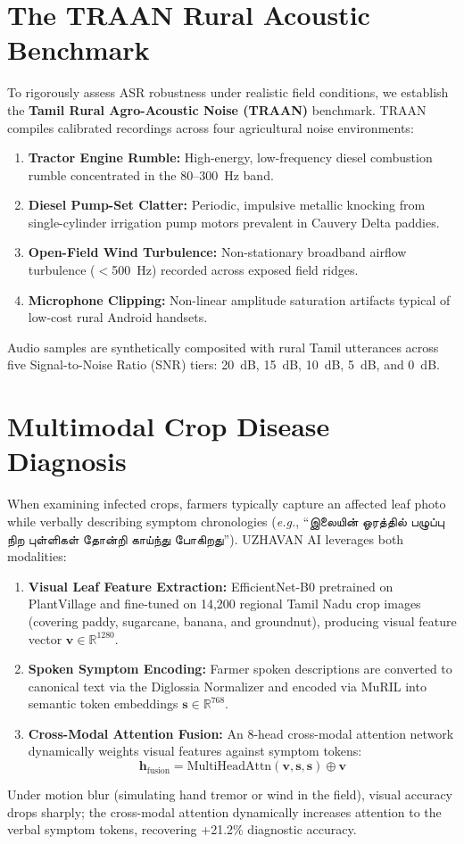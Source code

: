 \documentclass[conference]{IEEEtran}
\begin{document}
\section{The TRAAN Rural Acoustic Benchmark}
To rigorously assess ASR robustness under realistic field conditions, we establish the \textbf{Tamil Rural Agro-Acoustic Noise (TRAAN)} benchmark. TRAAN compiles calibrated recordings across four agricultural noise environments:
\begin{enumerate}
    \item \textbf{Tractor Engine Rumble:} High-energy, low-frequency diesel combustion rumble concentrated in the 80--300~Hz band.
    \item \textbf{Diesel Pump-Set Clatter:} Periodic, impulsive metallic knocking from single-cylinder irrigation pump motors prevalent in Cauvery Delta paddies.
    \item \textbf{Open-Field Wind Turbulence:} Non-stationary broadband airflow turbulence ($<$500~Hz) recorded across exposed field ridges.
    \item \textbf{Microphone Clipping:} Non-linear amplitude saturation artifacts typical of low-cost rural Android handsets.
\end{enumerate}
Audio samples are synthetically composited with rural Tamil utterances across five Signal-to-Noise Ratio (SNR) tiers: 20~dB, 15~dB, 10~dB, 5~dB, and 0~dB.

\section{Multimodal Crop Disease Diagnosis}
When examining infected crops, farmers typically capture an affected leaf photo while verbally describing symptom chronologies (\textit{e.g.}, ``இலையின் ஓரத்தில் பழுப்பு நிற புள்ளிகள் தோன்றி காய்ந்து போகிறது''). UZHAVAN AI leverages both modalities:
\begin{enumerate}
    \item \textbf{Visual Leaf Feature Extraction:} EfficientNet-B0 pretrained on PlantVillage and fine-tuned on 14,200 regional Tamil Nadu crop images (covering paddy, sugarcane, banana, and groundnut), producing visual feature vector $\mathbf{v} \in \mathbb{R}^{1280}$.
    \item \textbf{Spoken Symptom Encoding:} Farmer spoken descriptions are converted to canonical text via the Diglossia Normalizer and encoded via MuRIL into semantic token embeddings $\mathbf{s} \in \mathbb{R}^{768}$.
    \item \textbf{Cross-Modal Attention Fusion:} An 8-head cross-modal attention network dynamically weights visual features against symptom tokens:
    \begin{equation}
    \mathbf{h}_{\text{fusion}} = \text{MultiHeadAttn}(\mathbf{v}, \mathbf{s}, \mathbf{s}) \oplus \mathbf{v}
    \end{equation}
\end{enumerate}
Under motion blur (simulating hand tremor or wind in the field), visual accuracy drops sharply; the cross-modal attention dynamically increases attention to the verbal symptom tokens, recovering +21.2\% diagnostic accuracy.
\end{document}
